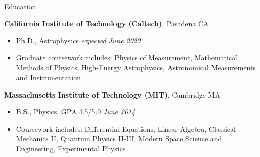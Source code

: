 \documentclass{resume} %
\begin{document}

\begin{rSection}{Education}

{\bf California Institute of Technology (Caltech)}, Pasadena CA
\begin{itemize}
  \item Ph.D., Astrophysics \hfill \emph{expected June 2020}
\item Graduate coursework includes: 
  Physics of Measurement, Mathematical Methods of Physics,
  High-Energy Astrophysics, Astronomical Measurements and Instrumentation
\end{itemize}

{\bf Massachusetts Institute of Technology (MIT)}, Cambridge MA
\begin{itemize}
\item B.S., Physics, GPA 4.5/5.0 \hfill {\em June 2014}
\item Coursework includes: Differential Equations, Linear Algebra,
  Classical Mechanics II, Quantum Physics II-III,
  Modern Space Science and Engineering, Experimental Physics
\end{itemize}

\end{rSection}


\end{document}
